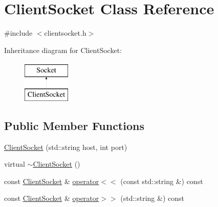 \hypertarget{class_client_socket}{\section{Client\-Socket Class Reference}
\label{class_client_socket}
}


{\ttfamily \#include $<$clientsocket.\-h$>$}

Inheritance diagram for Client\-Socket\-:\begin{figure}[H]
\begin{center}
\leavevmode
\includegraphics[height=2.000000cm]{class_client_socket}
\end{center}
\end{figure}
\subsection*{Public Member Functions}
\begin{DoxyCompactItemize}
\item 
\hyperlink{class_client_socket_a02809f0ffec549af450364df54175cce}{Client\-Socket} (std\-::string host, int port)
\item 
virtual \hyperlink{class_client_socket_a9c8af4fc4f56b62ef0ff7d67037f65a3}{$\sim$\-Client\-Socket} ()
\item 
const \hyperlink{class_client_socket}{Client\-Socket} \& \hyperlink{class_client_socket_a2fe5c2037ee6bdcc4d578db1111928ba}{operator$<$$<$} (const std\-::string \&) const 
\item 
const \hyperlink{class_client_socket}{Client\-Socket} \& \hyperlink{class_client_socket_a6cb39e9222b501c8b070de60ef6b5fbc}{operator$>$$>$} (std\-::string \&) const 
\end{DoxyCompactItemize}


